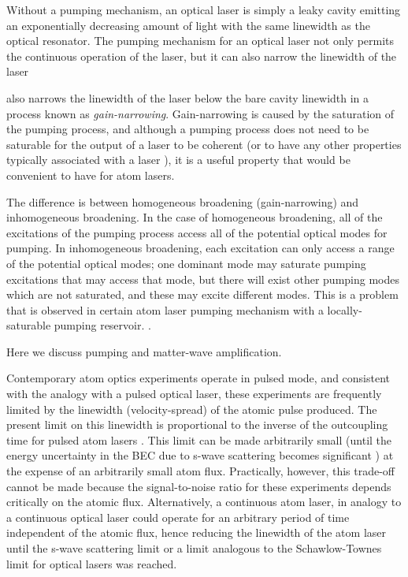 Without a pumping mechanism, an optical laser is simply a leaky cavity emitting an exponentially decreasing amount of light with the same linewidth as the optical resonator.  The pumping mechanism for an optical laser not only permits the continuous operation of the laser, but it can also narrow the linewidth of the laser 

also narrows the linewidth of the laser below the bare cavity linewidth in a process known as \emph{gain-narrowing}.  Gain-narrowing is caused by the saturation of the pumping process, and although a pumping process does not need to be saturable for the output of a laser to be coherent (or to have any other properties typically associated with a laser \cite{Wiseman:1997ba}), it is a useful property that would be convenient to have for atom lasers.

The difference is between homogeneous broadening (gain-narrowing) and inhomogeneous broadening.  In the case of homogeneous broadening, all of the excitations of the pumping process access all of the potential optical modes for pumping. In inhomogeneous broadening, each excitation can only access a range of the potential optical modes; one dominant mode may saturate pumping excitations that may access that mode, but there will exist other pumping modes which are not saturated, and these may excite different modes.  This is a problem that is observed in certain atom laser pumping mechanism with a locally-saturable pumping reservoir.  \citep{SalehTeich}.



Here we discuss pumping and matter-wave amplification.

Contemporary atom optics experiments operate in pulsed mode, and consistent with the analogy with a pulsed optical laser, these experiments are frequently limited by the linewidth (velocity-spread) of the atomic pulse produced. The present limit on this linewidth is proportional to the inverse of the outcoupling time for pulsed atom lasers \cite{Johnsson:2007}.  This limit can be made arbitrarily small (until the energy uncertainty in the BEC due to s-wave scattering becomes significant \cite{Johnsson:2007a}) at the expense of an arbitrarily small atom flux.  Practically, however, this trade-off cannot be made because the signal-to-noise ratio for these experiments depends critically on the atomic flux.  Alternatively, a continuous atom laser, in analogy to a continuous optical laser could operate for an arbitrary period of time independent of the atomic flux, hence reducing the linewidth of the atom laser until the s-wave scattering limit \cite{Johnsson:2007a} or a limit analogous to the Schawlow-Townes limit for optical lasers \cite{Schawlow:1958} was reached.


